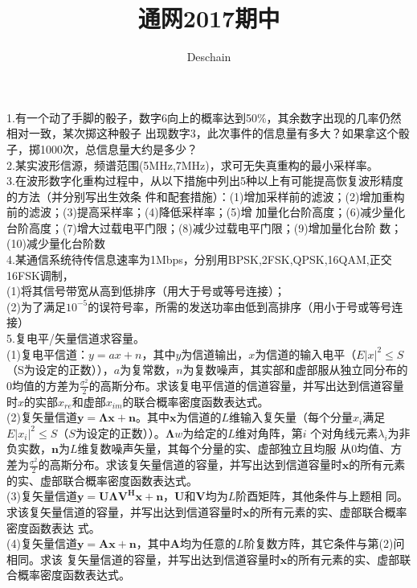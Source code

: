 \documentclass[UTF8]{ctexart}
\title{通网2017期中}
\author{Deschain}
\begin{document}
\maketitle
\section*{}
1.有一个动了手脚的骰子，数字6向上的概率达到50\%，其余数字出现的几率仍然相对一致，某次掷这种骰子
出现数字3，此次事件的信息量有多大？如果拿这个骰子，掷1000次，总信息量大约是多少？\\
2.某实波形信源，频谱范围(5MHz,7MHz)，求可无失真重构的最小采样率。\\
3.在波形数字化重构过程中，从以下措施中列出5种以上有可能提高恢复波形精度的方法（并分别写出生效条
件和配套措施）：(1)增加采样前的滤波；(2)增加重构前的滤波；(3)提高采样率；(4)降低采样率；(5)增
加量化台阶高度；(6)减少量化台阶高度；(7)增大过载电平门限；(8)减少过载电平门限；(9)增加量化台阶
数；(10)减少量化台阶数\\
4.某通信系统待传信息速率为1Mbps，分别用BPSK,2FSK,QPSK,16QAM,正交16FSK调制，\\
(1)将其信号带宽从高到低排序（用大于号或等号连接）；\\
(2)为了满足$10^{-5}$的误符号率，所需的发送功率由低到高排序（用小于号或等号连接）\\
5.复电平/矢量信道求容量。\\
(1)复电平信道：$y=ax+n$，其中$y$为信道输出，$x$为信道的输入电平（$E\lvert x\rvert^2\leq S$
（S为设定的正数）），$a$为复常数，$n$为复数噪声，其实部和虚部服从独立同分布的0均值的方差为$
  \frac{\sigma^2}{2}$的高斯分布。求该复电平信道的信道容量，并写出达到信道容量时$x$的实部$x_{re}
$和虚部$x_{im}$的联合概率密度函数表达式。\\
(2)复矢量信道$\bm{y=\Lambda x+n}$。其中$\bm{x}$为信道的$L$维输入复矢量（每个分量$x_i$满足
$E\lvert x_i\rvert^2\leq S$（$S$为设定的正数））。$\bm{\Lambda}w$为给定的$L$维对角阵，第$i$
个对角线元素$\lambda_i$为非负实数，$\bm{n}$为$L$维复数噪声矢量，其每个分量的实、虚部独立且均服
从0均值、方差为$\frac{\sigma^2}{2}$的高斯分布。求该复矢量信道的容量，并写出达到信道容量时$\bm
  {x}$的所有元素的实、虚部联合概率密度函数表达式。\\
(3)复矢量信道$\bm{y=U\Lambda V^Hx+n}$，$\bm{U}$和$\bm{V}$均为$L$阶酉矩阵，其他条件与上题相
同。求该复矢量信道的容量，并写出达到信道容量时$\bm{x}$的所有元素的实、虚部联合概率密度函数表达
式。\\
(4)复矢量信道$\bm{y=Ax+n}$，其中$\bm{A}$均为任意的$L$阶复数方阵，其它条件与第(2)问相同。求该
复矢量信道的容量，并写出达到信道容量时$\bm{x}$的所有元素的实、虚部联合概率密度函数表达式。\\
\end{document}
